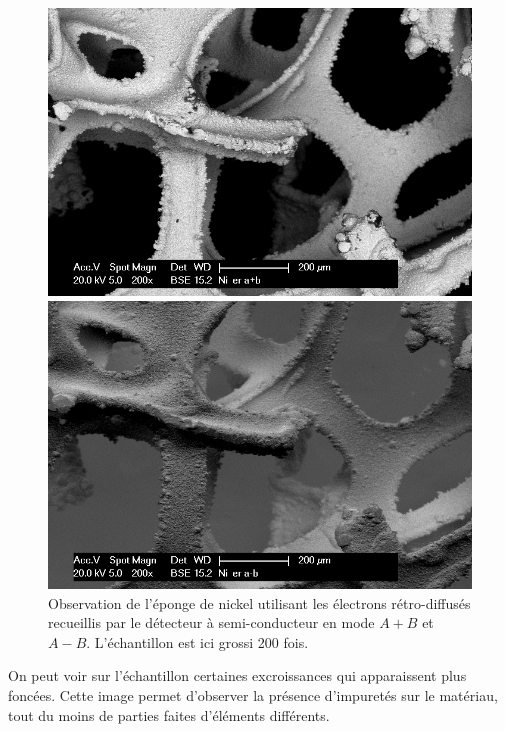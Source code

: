 \documentclass[a4paper,12pt]{article}
\begin{document}
\begin{figure}[h!]
\begin{minipage}[c]{.55\linewidth}
\centering
\includegraphics[width = 1 \textwidth]{images/ni_er_apb.png}
\end{minipage}
\begin{minipage}[c]{.55\linewidth}
\includegraphics[width = 1 \textwidth]{images/ni_er_amb.png}
\end{minipage}
\caption{Observation de l'éponge de nickel utilisant les électrons rétro-diffusés recueillis par le détecteur à semi-conducteur en mode $A+B$ et $A-B$. L'échantillon est ici grossi 200 fois.}
\label{fig:ni_er_apb_amb}
\end{figure}

\newpage

On peut voir sur l'échantillon certaines excroissances qui apparaissent plus foncées. Cette image permet d'observer
la présence d'impuretés sur le matériau, tout du moins de parties faites d'éléments différents.
\end{document}
